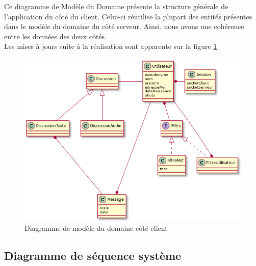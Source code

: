 	\newpage

	Ce diagramme de Modèle du Domaine présente la structure générale de l'application du côté du client.
	Celui-ci réutilise la plupart des entités présentes dans le modèle du domaine du côté serveur.
	Ainsi, nous avons une cohérence entre les données des deux côtés. \\
	
		Les mises à jours suite à la réalisation sont apparente sur la figure \ref{modeleDomaineClient}.
		
	\begin{figure}[H]
	\centerline{\includegraphics[width=16.5cm]{img/modeleDomaineClient.png}}
		\caption{Diagramme de modèle du domaine côté client}
		\label{modeleDomaineClient}
	\end{figure}

	\newpage

	\subsection{Diagramme de séquence système}
	
